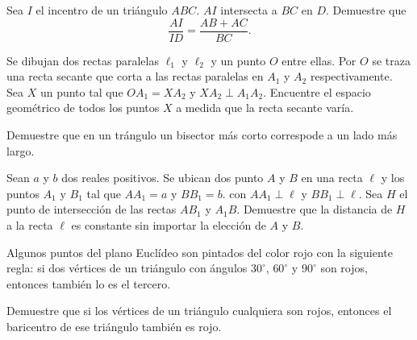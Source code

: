 \begin{problem}
Sea $I$ el incentro de un triángulo $ABC$.
$AI$ intersecta a $BC$ en $D$. Demuestre que
\[\frac{AI}{ID} = \frac{AB + AC}{BC}.\]
\end{problem}

\begin{problem}
Se dibujan dos rectas paralelas $\ell_1$
y $\ell_2$ y un punto
$O$ entre ellas. Por $O$ se traza una recta
secante que corta a las rectas paralelas
en $A_1$ y $A_2$ respectivamente. Sea $X$
un punto tal que $OA_1 = XA_2$ y $XA_2 \perp A_1A_2$.
Encuentre el espacio geométrico de todos los puntos $X$
a medida que la recta secante varía.
\end{problem}

\begin{problem}
Demuestre que en un trángulo
un bisector más corto correspode
a un lado más largo.
\end{problem}

\begin{problem}
Sean $a$ y $b$ dos reales positivos.
Se ubican dos punto $A$
y $B$ en una recta $\ell$ y los puntos $A_1$
y $B_1$ tal que $AA_1 = a$ y $BB_1 = b$.
con $AA_1 \perp \ell$ y $BB_1 \perp \ell$.
Sea $H$ el punto de intersección de las rectas
$AB_1$ y $A_1B$. Demuestre que la distancia
de $H$ a la recta $\ell$ es constante
sin importar la elección de $A$ y $B$.
\end{problem}

\begin{problem}[Iberoamericana 2024]
Algunos puntos del plano Euclídeo son pintados
del color rojo con la siguiente regla:
si dos vértices de un triángulo con ángulos
$30^\circ$, $60^\circ$ y $90^\circ$ son rojos,
entonces también lo es el tercero.

Demuestre que si los vértices de un
triángulo cualquiera son rojos,
entonces el baricentro de ese triángulo
también es rojo.
\end{problem}
